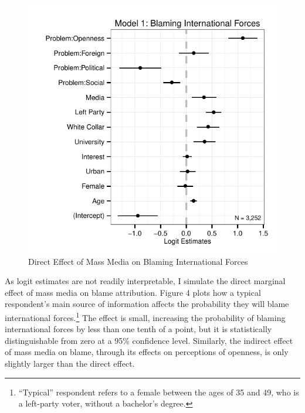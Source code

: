 \documentclass[12pt]{report}
\begin{document}
\begin{center}
\begin{figure}
\includegraphics{article1_blame_coefs}
\caption{Direct Effect of Mass Media on Blaming International Forces}
\end{figure}
\end{center}

As logit estimates are not readily interpretable, I simulate the direct marginal effect of mass media on
blame attribution. Figure 4 plots how a typical respondent's main source of information affects the
probability they will blame international forces.\footnote{``Typical'' respondent refers to a
female between the ages of 35 and 49, who is a left-party voter, without a bachelor's degree.}
The effect is small, increasing the probability of blaming international forces by less than one
tenth of a point, but it is statistically distinguishable from zero at a 95\% confidence level.
Similarly, the indirect effect of mass media on blame, through its effects on perceptions of
openness, is only slightly larger than the direct effect.
\end{document}
